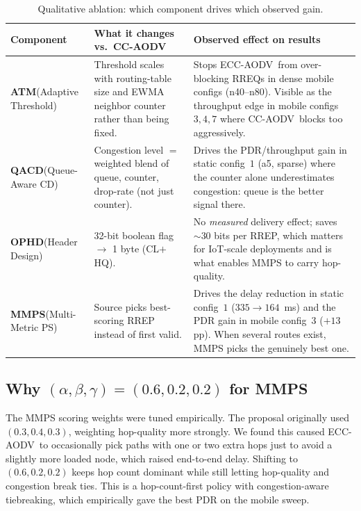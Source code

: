 \documentclass[11pt,a4paper]{article}
\newcommand{\ecc}{ECC-AODV}
\newcommand{\cca}{CC-AODV}
\begin{document}
\begin{table}[h]
\centering
\caption{Qualitative ablation: which component drives which observed gain.}
\label{tab:ablation}
\footnotesize
\begin{tabular}{p{2.6cm} p{4.0cm} p{6.5cm}}
\toprule
\textbf{Component} & \textbf{What it changes vs.\ \cca} & \textbf{Observed effect on results} \\
\midrule
\textbf{ATM}\newline (Adaptive Threshold) & Threshold scales with routing-table size and EWMA neighbor counter rather than being fixed. & Stops \ecc\ from over-blocking RREQs in dense mobile configs (n40--n80). Visible as the throughput edge in mobile configs $3,4,7$ where \cca\ blocks too aggressively. \\
\midrule
\textbf{QACD}\newline (Queue-Aware CD) & Congestion level $=$ weighted blend of queue, counter, drop-rate (not just counter). & Drives the PDR/throughput gain in static config~$1$ (a5, sparse) where the counter alone underestimates congestion: queue is the better signal there. \\
\midrule
\textbf{OPHD}\newline (Header Design) & 32-bit boolean flag $\to$ 1 byte (CL$+$HQ). & No \emph{measured} delivery effect; saves $\sim 30$ bits per RREP, which matters for IoT-scale deployments and is what enables MMPS to carry hop-quality. \\
\midrule
\textbf{MMPS}\newline (Multi-Metric PS) & Source picks best-scoring RREP instead of first valid. & Drives the delay reduction in static config~$1$ ($335 \to 164$~ms) and the PDR gain in mobile config~$3$ ($+13$ pp). When several routes exist, MMPS picks the genuinely best one. \\
\bottomrule
\end{tabular}
\end{table}

\subsection{Why $(\alpha,\beta,\gamma) = (0.6,0.2,0.2)$ for MMPS}

The MMPS scoring weights were tuned empirically. The proposal originally used
$(0.3,0.4,0.3)$, weighting hop-quality more strongly. We found this caused
\ecc\ to occasionally pick paths with one or two extra hops just to avoid a
slightly more loaded node, which raised end-to-end delay. Shifting to
$(0.6,0.2,0.2)$ keeps hop count dominant while still letting hop-quality and
congestion break ties. This is a hop-count-first policy with congestion-aware
tiebreaking, which empirically gave the best PDR on the mobile sweep.
\end{document}
